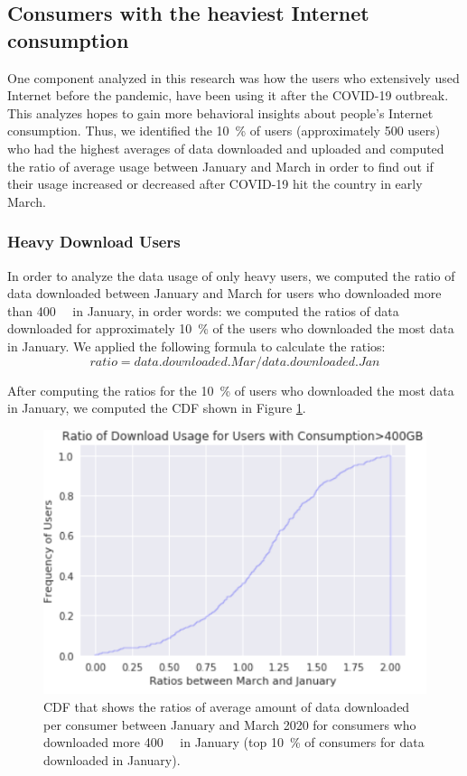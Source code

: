 \documentclass[conference]{IEEEtran}
\begin{document}
\subsection{Consumers with the heaviest Internet consumption}
\label{sec:analyzing-the-users-with-the-highest-internet-usage}

One component analyzed in this research was how the users who extensively used  Internet before the pandemic, have been using it after the COVID-19 outbreak. This analyzes hopes to gain more behavioral insights about people's Internet consumption. Thus, we identified the \SI{10}{\percent} of users (approximately 500 users) who had the highest averages of data downloaded and uploaded and computed the ratio of average usage between January and March in order to find out if their usage increased or decreased after COVID-19 hit the country in early March. 


\subsubsection{Heavy Download Users}
\label{sec:heavy-download-users}

In order to analyze the data usage of only heavy users, we computed the ratio of data downloaded between January and March for users who downloaded more than \SI{400}{\giga\byte} in January, in order words: we computed the ratios of data downloaded for approximately \SI{10}{\percent} of the users who downloaded the most data in January. We applied the following formula to calculate the ratios:
\begin{equation}
ratio= data.downloaded.Mar/ data.downloaded.Jan 
\end{equation}

After computing the ratios for the \SI{10}{\percent} of users who downloaded the most data in January, we computed the CDF shown in Figure \ref{fig:heavydown}.

\begin{figure}[h!]
\centering
\includegraphics[width=1.0\linewidth]{heavydown.PNG}
\caption{CDF that shows the ratios of average amount of data downloaded per consumer between January and March 2020 for consumers who downloaded more \SI{400}{\giga\byte} in January (top \SI{10}{\percent} of consumers for data downloaded in January).}
\label{fig:heavydown}
\end{figure}
\end{document}
